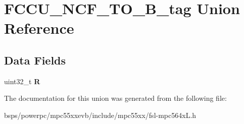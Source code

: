 \hypertarget{unionFCCU__NCF__TO__32B__tag}{}\section{F\+C\+C\+U\+\_\+\+N\+C\+F\+\_\+\+T\+O\+\_\+B\+\_\+tag Union Reference}
\label{unionFCCU__NCF__TO__32B__tag}
\subsection*{Data Fields}
\begin{DoxyCompactItemize}
\item 
\mbox{\label{unionFCCU__NCF__TO__32B__tag_abda761d0f980e1eae473300d7de633cf}} 
uint32\+\_\+t {\bfseries R}
\end{DoxyCompactItemize}


The documentation for this union was generated from the following file\+:\begin{DoxyCompactItemize}
\item 
bsps/powerpc/mpc55xxevb/include/mpc55xx/fsl-\/mpc564x\+L.\+h\end{DoxyCompactItemize}
